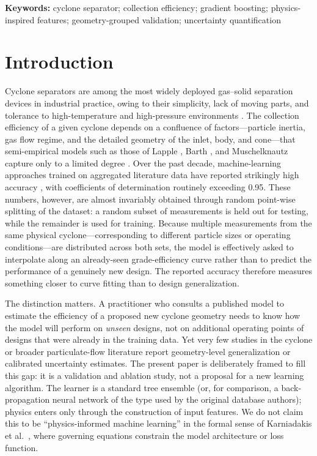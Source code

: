 \documentclass[12pt]{article}
\begin{document}
\noindent\textbf{Keywords:} cyclone separator; collection efficiency; gradient boosting; physics-inspired features; geometry-grouped validation; uncertainty quantification

\section{Introduction}

Cyclone separators are among the most widely deployed gas--solid separation devices in industrial practice, owing to their simplicity, lack of moving parts, and tolerance to high-temperature and high-pressure environments \cite{hoffmann}. The collection efficiency of a given cyclone depends on a confluence of factors---particle inertia, gas flow regime, and the detailed geometry of the inlet, body, and cone---that semi-empirical models such as those of Lapple \cite{lapple}, Barth \cite{barth}, and Muschelknautz \cite{muschel} capture only to a limited degree \cite{hoffmann92,dirgo}. Over the past decade, machine-learning approaches trained on aggregated literature data have reported strikingly high accuracy \cite{bregolin,elsayed,zhao}, with coefficients of determination routinely exceeding 0.95. These numbers, however, are almost invariably obtained through random point-wise splitting of the dataset: a random subset of measurements is held out for testing, while the remainder is used for training. Because multiple measurements from the same physical cyclone---corresponding to different particle sizes or operating conditions---are distributed across both sets, the model is effectively asked to interpolate along an already-seen grade-efficiency curve rather than to predict the performance of a genuinely new design. The reported accuracy therefore measures something closer to curve fitting than to design generalization.

The distinction matters. A practitioner who consults a published model to estimate the efficiency of a proposed new cyclone geometry needs to know how the model will perform on \emph{unseen} designs, not on additional operating points of designs that were already in the training data. Yet very few studies in the cyclone or broader particulate-flow literature report geometry-level generalization or calibrated uncertainty estimates. The present paper is deliberately framed to fill this gap: it is a validation and ablation study, not a proposal for a new learning algorithm. The learner is a standard tree ensemble (or, for comparison, a back-propagation neural network of the type used by the original database authors); physics enters only through the construction of input features. We do not claim this to be ``physics-informed machine learning'' in the formal sense of Karniadakis et al.\ \cite{karniadakis}, where governing equations constrain the model architecture or loss function.
\end{document}
